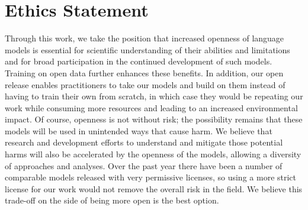 \documentclass[11pt]{article}
\begin{document}
\section*{Ethics Statement}
Through this work, we take the position that increased openness of language models is essential for scientific understanding of their abilities and limitations and for broad participation in the continued development of such models.  
Training on open data further enhances these benefits. In addition, our open release enables practitioners to take our models and build on them instead of having to train their own from scratch, in which case they would be repeating our work while consuming more resources and leading to an increased environmental impact. 
Of course, openness is not without risk; the possibility remains that these models will be used in unintended ways that cause harm.  
We believe that research and development efforts to understand and mitigate those potential harms will also be accelerated by the openness of the models, allowing a diversity of approaches and analyses. 
Over the past year there have been a number of comparable models released with very permissive licenses, so using a more strict license for our work would not remove the overall risk in the field. 
We believe this trade-off on the side of being more open is the best option.


\end{document}
